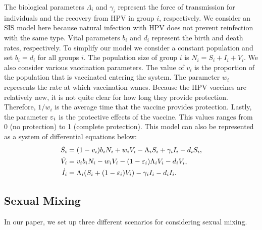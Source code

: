 \documentclass[12pt]{article}
\begin{document}
The biological parameters $\Lambda_i$ and $\gamma_i$ represent the force of transmission for individuals and the recovery from HPV in group $i$, respectively.  We consider an SIS model here because natural infection with HPV does not prevent reinfection with the same type.  Vital parameters $b_i$ and $d_i$ represent the birth and death rates, respectively.  To simplify our model we consider a constant population and set $b_i=d_i$ for all groups $i$.  The population size of group $i$ is $N_i=S_i+I_i+V_i$.  We also consider various vaccination parameters.  The value of $v_i$ is the proportion of the population that is vaccinated entering the system.  The parameter $w_i$ represents the rate at which vaccination wanes.  Because the HPV vaccines are relatively new, it is not quite clear for how long they provide protection.  Therefore, $1/w_i$ is the average time that the vaccine provides protection.  Lastly, the parameter $\varepsilon_i$ is the protective effects of the vaccine. This values ranges from 0 (no protection) to 1 (complete protection).  This model can also be represented as a system of differential equations below:
\begin{subequations}
\begin{align}
\dot{S_i} &= (1-v_i)b_iN_i + w_iV_i - \Lambda_iS_i + \gamma_i I_i - d_iS_i,\\
\dot{V_i} &= v_ib_iN_i - w_iV_i - (1-\varepsilon_i)\Lambda_iV_i  - d_iV_i,\\
\dot{I_i} &=  \Lambda_i(S_i+(1-\varepsilon_i)V_i) - \gamma_i I_i - d_iI_i.\end{align}
\end{subequations}


\subsection{Sexual Mixing}

In our paper, we set up three different scenarios for considering sexual mixing.
\end{document}
